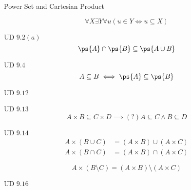 \begin{frame}{}
  \centerline{\Large Power Set and Cartesian Product}
\end{frame}

\begin{frame}{}
  \begin{definition}
    \[
      \forall X \exists Y \forall u (u \in Y \iff u \subseteq X)
    \]
  \end{definition}
\end{frame}

\begin{frame}{}
  \begin{exampleblock}{UD $9.2 (a)$}
    \[
      \ps{A} \cap \ps{B} \subseteq \ps{A \cup B}
    \]
  \end{exampleblock}
\end{frame}

\begin{frame}{}
  \begin{exampleblock}{UD $9.4$}
    \[
      A \subseteq B \iff \ps{A} \subseteq \ps{B}
    \]
  \end{exampleblock}
\end{frame}

\begin{frame}{}
  \begin{exampleblock}{UD $9.12$}
  \end{exampleblock}
\end{frame}

\begin{frame}{}
  \begin{exampleblock}{UD $9.13$}
    \[
      A \times B \subseteq C \times D \implies (?) A \subseteq C \land B \subseteq D
    \]
  \end{exampleblock}
\end{frame}

\begin{frame}{}
  \begin{exampleblock}{UD $9.14$}
    \begin{align*}
      A \times (B \cup C) &= (A \times B) \cup (A \times C)\\
      A \times (B \cap C) &= (A \times B) \cap (A \times C)
    \end{align*}
  \end{exampleblock}

  \pause
  \[
    A \times (B \setminus C) = (A \times B) \setminus (A \times C)
  \]
\end{frame}

\begin{frame}{}
  \begin{exampleblock}{UD $9.16$}
  \end{exampleblock}
\end{frame}
